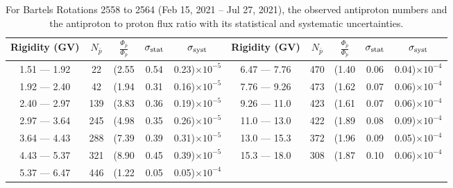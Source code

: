 \begin{table}[p] 
\renewcommand\baselinestretch{1.3}\selectfont
\setlength\tabcolsep{3pt}
\centering
\begin{tabular}{ccccc | ccccc}
\hline
\textbf{Rigidity}  (GV)  & $N_{\bar{p}}$ & $\frac{\Phi_{\bar{p}}}{\Phi_{p}}$ & $\sigma_{\rm{stat}}$ & $\sigma_{\rm{syst}}$ \hspace{1cm}   & \textbf{Rigidity}  (GV)  & $N_{\bar{p}}$ & $\frac{\Phi_{\bar{p}}}{\Phi_{p}}$ & $\sigma_{\rm{stat}}$ & $\sigma_{\rm{syst}}$ \hspace{1cm} \\ 
\hline
1.51 — 1.92   &  22                  &(2.55                          &  0.54              &      0.23)$\times 10^{-5}$  & 6.47 — 7.76                &  470                    &(1.40                               &  0.06                   &      0.04)$\times 10^{-4}$\\
1.92 — 2.40   &  42                  &(1.94                          &  0.31              &      0.16)$\times 10^{-5}$  & 7.76 — 9.26                &  473                    &(1.62                                &  0.07                   &      0.06)$\times 10^{-4}$\\
2.40 — 2.97   &  139                &(3.83                          &  0.36              &      0.19)$\times 10^{-5}$  & 9.26 — 11.0                &  423                    &(1.61                                &  0.07                   &      0.06)$\times 10^{-4}$\\    
2.97 — 3.64   &  245                &(4.98                          &  0.35              &      0.26)$\times 10^{-5}$  & 11.0 — 13.0                 &  422                    &(1.89                                &  0.08                   &      0.09)$\times 10^{-4}$\\    
3.64 — 4.43   &  288                &(7.39                          &  0.39              &      0.31)$\times 10^{-5}$  & 13.0 — 15.3               &  372                    &(1.96                                &  0.09                   &      0.05)$\times 10^{-4}$\\
4.43 — 5.37   &  321                &(8.90                          &  0.45              &      0.39)$\times 10^{-5}$  & 15.3 — 18.0               &  308                    &(1.87                                &  0.10                   &      0.06)$\times 10^{-4}$\\
5.37 — 6.47   &  446                &(1.22                          &  0.05              &      0.05)$\times 10^{-4}$  & \\
\hline
\end{tabular}
\caption[Antiproton to proton flux ratio for Bartels Rotations 2558 to 2564]{For Bartels Rotations 2558 to 2564 (Feb 15, 2021 – Jul 27, 2021), the observed antiproton numbers and the antiproton to proton flux ratio with its statistical and systematic uncertainties.}
\label{TableOfDependent23}
\end{table}